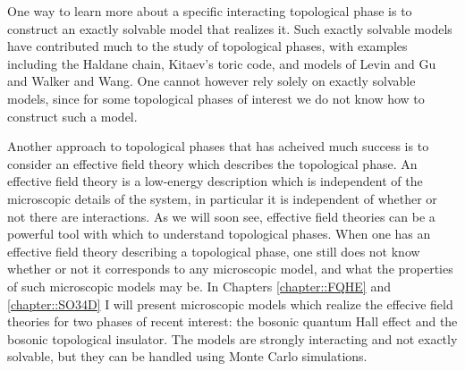 One way to learn more about a specific interacting topological phase is to construct an exactly solvable model that realizes it. Such exactly solvable models have contributed much to the study of topological phases, with examples including the Haldane chain, Kitaev's toric code\cite{KitaevToric}, and models of Levin and Gu\cite{LevinGu2012} and Walker and Wang\cite{WalkerWang,KeyserlingkBurnell2014}. One cannot however rely solely on exactly solvable models, since for some topological phases of interest we do not know how to construct such a model.

Another approach to topological phases that has acheived much success is to consider an effective field theory which describes the topological phase. An effective field theory is a low-energy description which is independent of the microscopic details of the system, in particular it is independent of whether or not there are interactions. As we will soon see, effective field theories can be a powerful tool with which to understand topological phases. When one has an effective field theory describing a topological phase, one still does not know whether or not it corresponds to any microscopic model, and what the properties of such microscopic models may be. In Chapters \ref{chapter::FQHE} and \ref{chapter::SO34D} I will present microscopic models which realize the effecive field theories for two phases of recent interest: the bosonic quantum Hall effect and the bosonic topological insulator. The models are strongly interacting and not exactly solvable, but they can be handled using Monte Carlo simulations.





